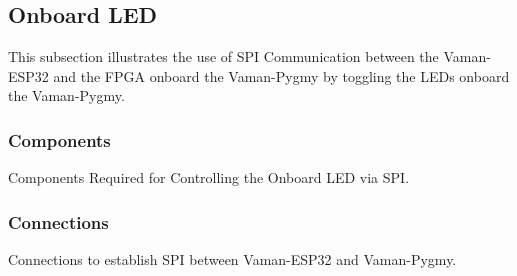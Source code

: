\subsection{Onboard LED}
This subsection illustrates the use of SPI Communication between the Vaman-ESP32
and the FPGA onboard the Vaman-Pygmy by toggling the LEDs onboard the
Vaman-Pygmy.

\subsubsection{Components}
\begin{table}[!ht]
    \centering
    
    \caption{Components Required for Controlling the Onboard LED via SPI.}
    \label{tab:esp32-fpga-led-components}
\end{table}

\subsubsection{Connections}
\begin{table}[!ht]
    \centering
    
    \caption{Connections to establish SPI between Vaman-ESP32 and Vaman-Pygmy.}
    \label{tab:esp32-fpga-led-connections}
\end{table}

